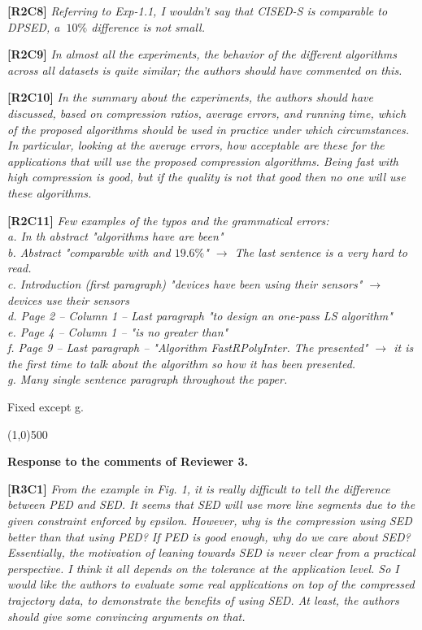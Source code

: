 \documentclass{letter}
\begin{document}
\textbf{[R2C8]} \emph{Referring to Exp-1.1, I wouldn't say that CISED-S is comparable to DPSED, a $~10\%$ difference is not small.}

\textbf{[R2C9]} \emph{In almost all the experiments, the behavior of the different algorithms across all datasets is quite similar; the authors should have commented on this.}

\textbf{[R2C10]} \emph{In the summary about the experiments, the authors should have discussed, based on compression ratios, average errors, and running time, which of the proposed algorithms should be used in practice under which circumstances.
In particular, looking at the average errors, how acceptable are these for the applications that will use the proposed compression algorithms. Being fast with high compression is good, but if the quality is not that good then no one will use these algorithms.
}

\textbf{[R2C11]} \emph{Few examples of the typos and the grammatical errors: \\
   a. In th abstract "algorithms have are been"	\\
   b. Abstract "comparable with and $19.6\%$" $\rightarrow$ The last sentence is a very hard to read.	\\
   c. Introduction (first paragraph) "devices have been using their sensors" $\rightarrow$ devices use their sensors	\\
   d. Page 2 -- Column 1 -- Last paragraph "to design an one-pass LS algorithm" \\
   e. Page 4 -- Column 1 -- "is no greater than" \\
   f. Page 9 -- Last paragraph -- "Algorithm FastRPolyInter. The presented" $\rightarrow$ it is the first time to talk about the algorithm so how it has been presented. \\
   g. Many single sentence paragraph throughout the paper. 
}

Fixed except g.


\line(1,0){500}

\textbf{Response to the comments of Reviewer 3.}

\textbf{[R3C1]} \emph{From the example in Fig. 1, it is really difficult to tell the difference between PED and SED. It seems that SED will use more line segments due to the given constraint enforced by epsilon. However, why is the compression using SED better than that using PED? If PED is good enough, why do we care about SED? Essentially, the motivation of leaning towards SED is never clear from a practical perspective. I think it all depends on the tolerance at the application level. So I would like the authors to evaluate some real applications on top of the compressed trajectory data, to demonstrate the benefits of using SED. At least, the authors should give some convincing arguments on that.}
\end{document}
